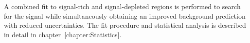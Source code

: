 A combined fit to signal-rich and signal-depleted regions is 
performed to search for the signal while simultaneously 
obtaining an improved background prediction with reduced uncertainties. The fit procedure and statistical analysis is described in detail in chapter~\ref{chapter:Statistics}.



